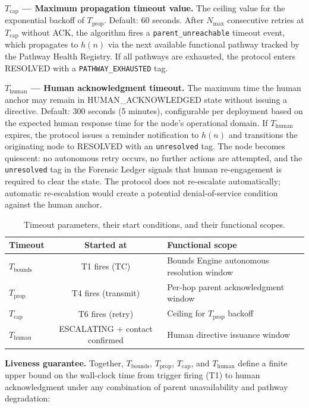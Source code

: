\bigskip
\noindent\textbf{$T_{\text{cap}}$ — Maximum propagation timeout value.}
The ceiling value for the exponential backoff of $T_{\text{prop}}$. Default: 60 seconds. After $N_{\max}$ consecutive retries at $T_{\text{cap}}$ without ACK, the algorithm fires a \texttt{parent\_unreachable} timeout event, which propagates to $h(n)$ via the next available functional pathway tracked by the Pathway Health Registry. If all pathways are exhausted, the protocol enters RESOLVED with a \texttt{PATHWAY\_EXHAUSTED} tag.

\bigskip
\noindent\textbf{$T_{\text{human}}$ — Human acknowledgment timeout.}
The maximum time the human anchor may remain in HUMAN\_ACKNOWLEDGED state without issuing a directive. Default: 300 seconds (5 minutes), configurable per deployment based on the expected human response time for the node's operational domain. If $T_{\text{human}}$ expires, the protocol issues a reminder notification to $h(n)$ and transitions the originating node to RESOLVED with an \texttt{unresolved} tag. The node becomes quiescent: no autonomous retry occurs, no further actions are attempted, and the \texttt{unresolved} tag in the Forensic Ledger signals that human re-engagement is required to clear the state. The protocol does not re-escalate automatically; automatic re-escalation would create a potential denial-of-service condition against the human anchor.

\begin{table}[htbp]
\caption{Timeout parameters, their start conditions, and their functional scopes.}
\label{tab:timeouts}
\begin{tabular}{@{}lcl@{}}
\toprule
\textbf{Timeout} & \textbf{Started at} & \textbf{Functional scope} \\
\midrule
$T_{\text{bounds}}$ & T1 fires (TC) & Bounds Engine autonomous resolution window \\
$T_{\text{prop}}$ & T4 fires (transmit) & Per-hop parent acknowledgment window \\
$T_{\text{cap}}$ & T6 fires (retry) & Ceiling for $T_{\text{prop}}$ backoff \\
$T_{\text{human}}$ & ESCALATING + contact confirmed & Human directive issuance window \\
\bottomrule
\end{tabular}
\end{table}

\bigskip
\noindent\textbf{Liveness guarantee.} Together, $T_{\text{bounds}}$, $T_{\text{prop}}$, $T_{\text{cap}}$, and $T_{\text{human}}$ define a finite upper bound on the wall-clock time from trigger firing (T1) to human acknowledgment under any combination of parent unavailability and pathway degradation:

